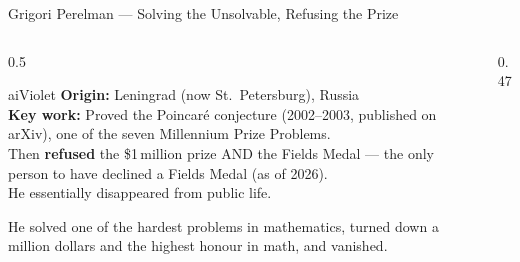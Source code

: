 \begin{frame}[shrink=17]{Grigori Perelman --- Solving the Unsolvable, Refusing the Prize}

  \begin{columns}[T]
    \begin{column}{0.5\textwidth}
      \begin{personbox}{aiViolet}
        \textbf{Origin:} Leningrad (now St.\ Petersburg), Russia\\[3pt]
        \textbf{Key work:} Proved the \alert{Poincar\'e conjecture}
        (2002--2003, published on arXiv), one of the seven Millennium
        Prize Problems.\\[4pt]
        Then \textbf{refused} the \$1\,million prize AND the Fields Medal
        --- the only person to have declined a Fields Medal (as of 2026).\\[4pt]
        He essentially disappeared from public life.
      \end{personbox}

      \vspace{0.3em}
      \begin{insightbox}
        He solved one of the hardest problems in mathematics, turned down
        a million dollars and the highest honour in math, and vanished.
      \end{insightbox}
    \end{column}

    \begin{column}{0.47\textwidth}
    \end{column}
  \end{columns}

\end{frame}

